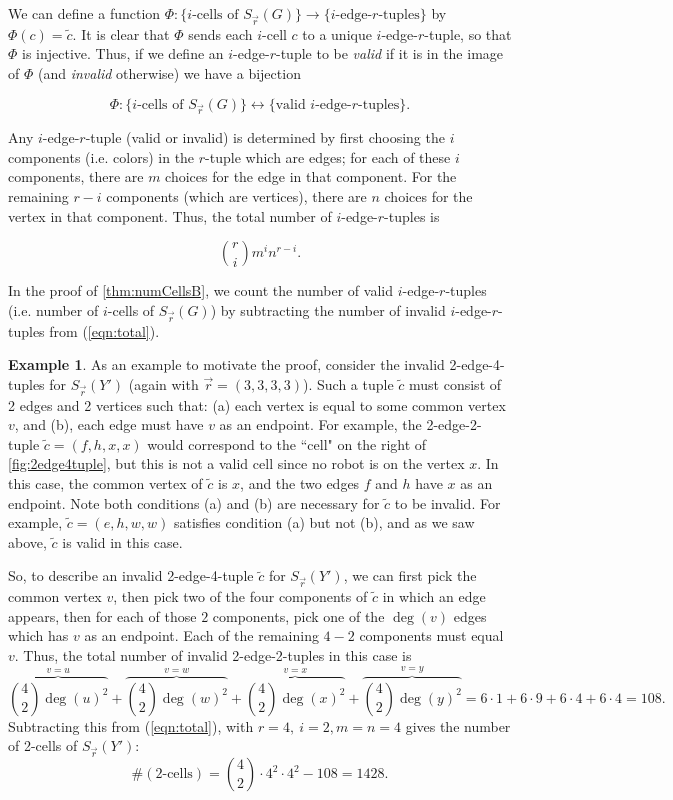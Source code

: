 \documentclass{amsart}
\newcommand{\Sr}{S_{\vec{r}}}
\newcommand{\from}{\!:}
\theoremstyle{definition}
\newtheorem{ex}[thm]{Example}
\theoremstyle{remark}
\begin{document}
We can define a function $\Phi\from\{\text{$i$-cells of $\Sr(G)$}\}\to\{\text{$i$-edge-$r$-tuples}\}$ by $\Phi(c)=\tilde c.$ It is clear that $\Phi$ sends each $i$-cell $c$ to a unique $i$-edge-$r$-tuple, so that $\Phi$ is injective. Thus, if we define an $i$-edge-$r$-tuple to be \textit{valid} if it is in the image of $\Phi$ (and \textit{invalid} otherwise) we have a bijection 

\begin{equation}\label{eqn:bijection}
    \Phi\from\{i\text{-cells of }\Sr(G)\}\leftrightarrow \{\text{valid $i$-edge-$r$-tuples}\}.
\end{equation}

Any $i$-edge-$r$-tuple (valid or invalid) is determined by first choosing the $i$ components (i.e. colors) in the $r$-tuple which are edges; for each of these $i$ components, there are $m$ choices for the edge in that component. For the remaining $r-i$ components (which are vertices), there are $n$ choices for the vertex in that component. Thus, the total number of $i$-edge-$r$-tuples is 

\begin{equation}\label{eqn:total}
    \binom{r}{i} m^in^{r-i}.
\end{equation}

In the proof of \cref{thm:numCellsB}, we count the number of valid $i$-edge-$r$-tuples (i.e. number of $i$-cells of $\Sr(G)$) by subtracting the number of invalid $i$-edge-$r$-tuples from (\ref{eqn:total}).

\begin{ex}
As an example to motivate the proof, consider the invalid 2-edge-4-tuples for $\Sr(Y')$ (again with $\vec r = (3,3,3,3)$). Such a tuple $\tilde c$ must consist of 2 edges and 2 vertices such that: (a) each vertex is equal to some common vertex $v$, and (b), each edge must have $v$ as an endpoint. For example, the 2-edge-2-tuple $\tilde c = (f,h,x,x)$ would correspond to the ``cell" on the right of \cref{fig:2edge4tuple}, but this is not a valid cell since no robot is on the vertex $x.$ In this case, the common vertex of $\tilde c$ is $x$, and the two edges $f$ and $h$ have $x$ as an endpoint. Note both conditions (a) and (b) are necessary for $\tilde c$ to be invalid. For example, $\tilde c = (e,h,w,w)$ satisfies condition (a) but not (b), and as we saw above, $\tilde c$ is valid in this case.

So, to describe an invalid 2-edge-4-tuple $\tilde c$ for $\Sr(Y')$, we can first pick the common vertex $v$, then pick two of the four components of $\tilde c$ in which an edge appears, then for each of those $2$ components, pick one of the $\deg(v)$ edges which has $v$ as an endpoint. Each of the remaining $4-2$ components must equal $v.$ Thus, the total number of invalid 2-edge-2-tuples in this case is 
\[
\overbrace{\binom{4}{2}\deg(u)^2}^{v=u}+\overbrace{\binom{4}{2}\deg(w)^2}^{v=w}+\overbrace{\binom{4}{2}\deg(x)^2}^{v=x}+\overbrace{\binom{4}{2}\deg(y)^2}^{v=y}=6\cdot1+6\cdot9+6\cdot4+6\cdot4=108.
\]
Subtracting this from (\ref{eqn:total}), with $r=4,\ i=2, m=n=4$ gives the number of 2-cells of $\Sr(Y')$:
\[
\#(\text{2-cells})=\binom{4}{2}\cdot4^2\cdot4^2-108=1428.
\]
\end{ex}
\end{document}
